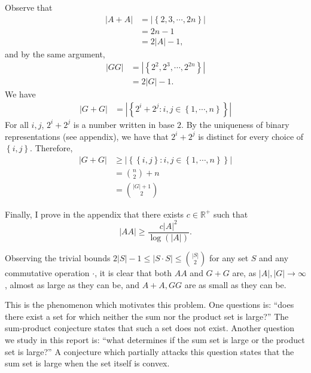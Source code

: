 \documentclass[12pt,reqno]{amsart}
\begin{document}
Observe that
\begin{align*}
    \left\lvert A + A \right\rvert  & = \left\lvert \left\{2,3, \cdots ,2n \right\}  \right\rvert \\
    & = 2n - 1 \\
    & = 2 \left\lvert A \right\rvert - 1,
\end{align*}
and by the same argument,
\begin{align*}
    \left\lvert GG \right\rvert  & = \left\lvert \left\{2^{2}, 2^{3}, \cdots , 2^{2n} \right\} \right\rvert  \\
    & =2 \left\lvert G \right\rvert -1.
\end{align*}
We have
\begin{align*}
    \left\lvert G + G \right\rvert & = \left\lvert \left\{ 2^{i} + 2^{j} : i,j \in \left\{ 1, \cdots , n \right\} \right\} \right\rvert
\end{align*}
For all \(i,j\), \(2^{i} + 2^{j}\) is a number written in base \(2\). By the uniqueness of binary representations
(see appendix), we have that \(2^{i} + 2^{j}\) is distinct for every choice of \(\left\{ i,j \right\} \). Therefore,
\begin{align*}
    \left\lvert G + G \right\rvert & \geq  \left\lvert \left\{ \left\{ i,j \right\} : i,j \in \left\{ 1, \cdots , n \right\}  \right\}  \right\rvert \\
    & = \binom{n}{2} + n \\
    & = \binom{\left\lvert G \right\rvert + 1}{2} 
\end{align*}

Finally, I prove in the appendix that there exists \(c \in \mathbb{R} ^{+}\) such that
\[
    \left\lvert AA \right\rvert \geq  \frac{c \left\lvert A \right\rvert ^{2}}{\log \left( \left\lvert A \right\rvert  \right) }
.\]

Observing the trivial bounds \( 2 \left\lvert S \right\rvert - 1 \leq \left\lvert S \cdot S \right\rvert \leq \binom{\left\lvert S \right\rvert }{2} \) for any set \(S\) and any
commutative operation \(\cdot \), it is clear that both \(AA\) and \(G +G\) are, as \(\left\lvert A \right\rvert, \left\lvert G \right\rvert \to \infty  \), almost as large as they can be,
and \(A + A, GG \) are as small as they can be.

This is the phenomenon which motivates this problem.
One questions is: ``does there exist a set for which neither the sum nor the product set is large?''
The sum-product conjecture states that such a set does not exist. 
Another question we study in this report is: ``what
determines if the sum set is large or the product set is large?'' A
conjecture which partially attacks this question states that the sum set is large
when the set itself is convex.
\end{document}
